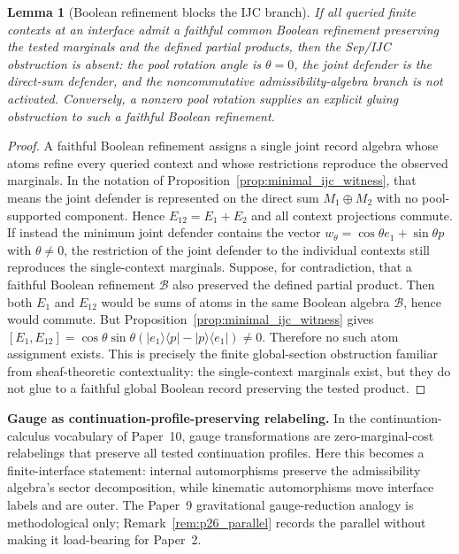 \documentclass[11pt]{article}
\newtheorem{lemma}[theorem]{Lemma}
\theoremstyle{definition}
\begin{document}
\begin{lemma}[Boolean refinement blocks the IJC branch]
\label{lem:boolean_refinement_blocks_ijc}
If all queried finite contexts at an interface admit a faithful common
Boolean refinement preserving the tested marginals and the defined partial
products, then the Sep/IJC obstruction is absent: the pool rotation angle
is $\theta=0$, the joint defender is the direct-sum defender, and the
noncommutative admissibility-algebra branch is not activated.  Conversely,
a nonzero pool rotation supplies an explicit gluing obstruction to such a
faithful Boolean refinement.
\end{lemma}

\begin{proof}
A faithful Boolean refinement assigns a single joint record algebra whose
atoms refine every queried context and whose restrictions reproduce the
observed marginals.  In the notation of Proposition~\ref{prop:minimal_ijc_witness},
that means the joint defender is represented on the direct sum
$M_1\oplus M_2$ with no pool-supported component.  Hence
$E_{12}=E_1+E_2$ and all context projections commute.  If instead the
minimum joint defender contains the vector
$w_\theta=\cos\theta e_1+\sin\theta p$ with $\theta\ne0$, the restriction
of the joint defender to the individual contexts still reproduces the
single-context marginals.  Suppose, for contradiction, that a faithful
Boolean refinement $\mathcal B$ also preserved the defined partial product.
Then both $E_1$ and $E_{12}$ would be sums of atoms in the same Boolean
algebra $\mathcal B$, hence would commute.  But Proposition~\ref{prop:minimal_ijc_witness}
gives $[E_1,E_{12}]=\cos\theta\sin\theta(|e_1\rangle\langle p|-|p\rangle\langle e_1|)\ne0$.
Therefore no such atom assignment exists.  This is precisely the finite
global-section obstruction familiar from sheaf-theoretic contextuality: the
single-context marginals exist, but they do not glue to a faithful global
Boolean record preserving the tested product.
\end{proof}

\smallskip\noindent\textbf{Gauge as continuation-profile-preserving relabeling.}\quad
In the continuation-calculus vocabulary of Paper~10, gauge transformations
are zero-marginal-cost relabelings that preserve all tested continuation
profiles.  Here this becomes a finite-interface statement: internal
automorphisms preserve the admissibility algebra's sector decomposition,
while kinematic automorphisms move interface labels and are outer.  The
Paper~9 gravitational gauge-reduction analogy is methodological only;
Remark~\ref{rem:p26_parallel} records the parallel without making it
load-bearing for Paper~2.
\end{document}

